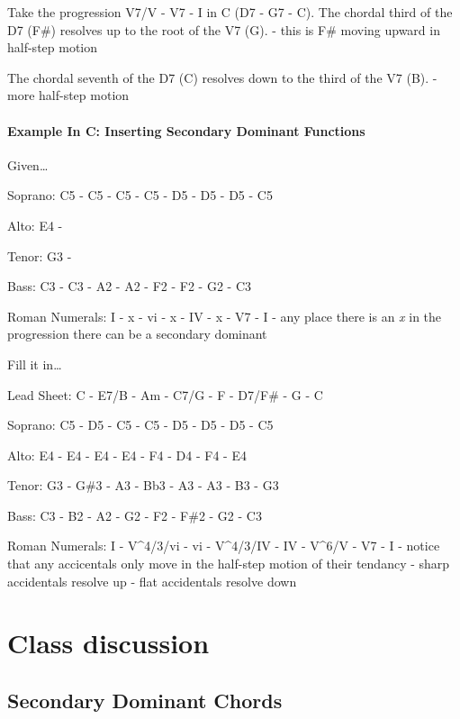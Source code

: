\documentclass{book}
\begin{document}
Take the progression V7/V - V7 - I in C (D7 - G7 - C). The chordal third of
the D7 (F\#) resolves up to the root of the V7 (G). - this is F\# moving
upward in half-step motion

The chordal seventh of the D7 (C) resolves down to the third of the V7 (B). -
more half-step motion

\hypertarget{example-in-c-inserting-secondary-dominant-functions}{%
\subsubsection{Example In C: Inserting Secondary Dominant
Functions}\label{example-in-c-inserting-secondary-dominant-functions}}

Given\ldots{}

Soprano: C5 - C5 - C5 - C5 - D5 - D5 - D5 - C5

Alto: E4 -

Tenor: G3 -

Bass: C3 - C3 - A2 - A2 - F2 - F2 - G2 - C3

Roman Numerals: I - x - vi - x - IV - x - V7 - I - any place there is an
\emph{x} in the progression there can be a secondary dominant

Fill it in\ldots{}

Lead Sheet: C - E7/B - Am - C7/G - F - D7/F\# - G - C

Soprano: C5 - D5 - C5 - C5 - D5 - D5 - D5 - C5

Alto: E4 - E4 - E4 - E4 - F4 - D4 - F4 - E4

Tenor: G3 - G\#3 - A3 - Bb3 - A3 - A3 - B3 - G3

Bass: C3 - B2 - A2 - G2 - F2 - F\#2 - G2 - C3

Roman Numerals: I - V\^{}4/3/vi - vi - V\^{}4/3/IV - IV - V\^{}6/V - V7 - I -
notice that any accicentals only move in the half-step motion of their
tendancy - sharp accidentals resolve up - flat accidentals resolve down

\hypertarget{class-discussion-23}{%
\chapter{Class discussion}\label{class-discussion-23}}

\hypertarget{secondary-dominant-chords}{%
\section{Secondary Dominant Chords}\label{secondary-dominant-chords}}
\end{document}
